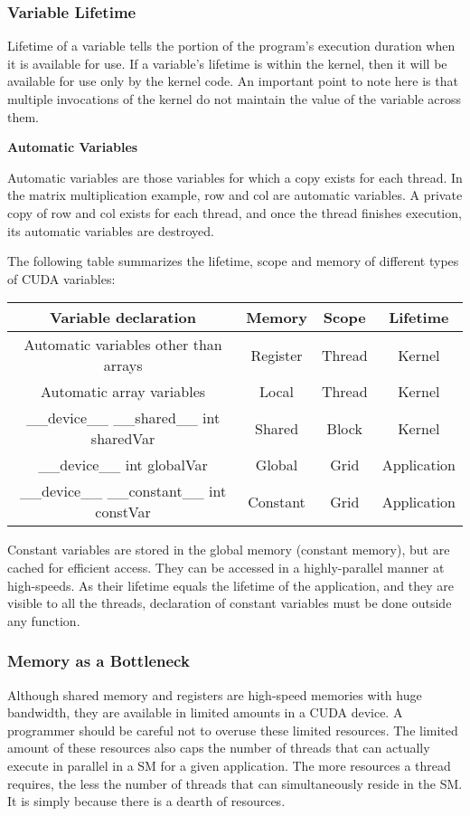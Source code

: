 \documentclass[../notes.tex]{subfiles}
\begin{document}
\subsubsection{Variable Lifetime}
Lifetime of a variable tells the portion of the program’s execution duration when it is available for use. If a variable’s lifetime is within the kernel, then it will be available for use only by the kernel code. An important point to note here is that multiple invocations of the kernel do not maintain the value of the variable across them.

\textbf{Automatic Variables}

Automatic variables are those variables for which a copy exists for each thread. In the matrix multiplication example, row and col are automatic variables. A private copy of row and col exists for each thread, and once the thread finishes execution, its automatic variables are destroyed.

The following table summarizes the lifetime, scope and memory of different types of CUDA variables:

\begin{tabular}{ |c|c|c|c| } 
  \hline
  Variable declaration & Memory & Scope & Lifetime \\
  \hline
  Automatic variables other than arrays & Register & Thread & Kernel \\
  \hline
  Automatic array variables & Local & Thread & Kernel\\
  \hline
  \_\_device\_\_ \_\_shared\_\_ int sharedVar & Shared & Block & Kernel \\
  \hline
  \_\_device\_\_ int globalVar & Global & Grid & Application \\ 
  \hline
  \_\_device\_\_ \_\_constant\_\_ int constVar & Constant & Grid & Application \\ 
  \hline
\end{tabular}

Constant variables are stored in the global memory (constant memory), but are cached for efficient access. They can be accessed in a highly-parallel manner at high-speeds. As their lifetime equals the lifetime of the application, and they are visible to all the threads, declaration of constant variables must be done outside any function.

\subsubsection{Memory as a Bottleneck}
Although shared memory and registers are high-speed memories with huge bandwidth, they are available in limited amounts in a CUDA device. A programmer should be careful not to overuse these limited resources. The limited amount of these resources also caps the number of threads that can actually execute in parallel in a SM for a given application. The more resources a thread requires, the less the number of threads that can simultaneously reside in the SM. It is simply because there is a dearth of resources.
\end{document}
